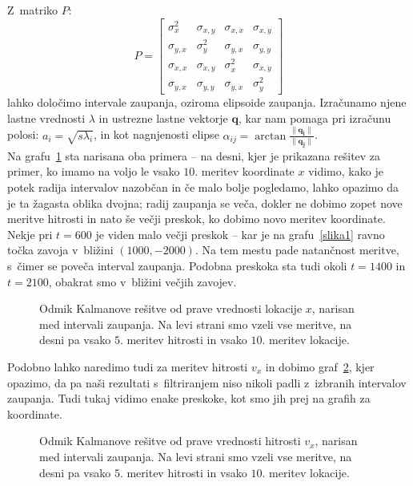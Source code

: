 \documentclass[a4paper,pdftex,10pt]{article}
\renewcommand{\vec}[1]{\boldsymbol{\mathbf{#1}}}
\numberwithin{figure}{section} %
\begin{document}
Z~matriko $P$:
\begin{equation}
    P = 
    \begin{bmatrix}
	\sigma_x^2 &  \sigma_{x,y} & \sigma_{x, \dot{x}} & \sigma_{x, \dot{y}}\\
	\sigma_{y,x} & \sigma_y^2 & \sigma_{y, \dot{x}} & \sigma_{y, \dot{y}}\\
	\sigma_{\dot{x},x} & \sigma_{\dot{x},y} 
			   & \sigma_{\dot{x}}^2 & \sigma_{\dot{x}, \dot{y}}\\
	\sigma_{\dot{y},x} & \sigma_{\dot{y},y} 
			   & \sigma_{\dot{y}, \dot{x}} & \sigma_{\dot{y}}^2
    \end{bmatrix}
\end{equation}
lahko določimo intervale zaupanja, oziroma elipsoide zaupanja. Izračunamo
njene lastne vrednosti $\lambda$ in ustrezne lastne vektorje $\vec{q}$, kar nam pomaga
pri izračunu polosi: $a_i=\sqrt{s \lambda_i}$, in kot nagnjenosti elipse $\alpha_{ij} = 
\arctan \frac{\| \vec{q_i} \|}{\| \vec{q_j} \|}$.\\
Na grafu~\ref{slika3} sta narisana oba primera -- na desni, kjer je prikazana rešitev za 
primer, ko imamo na voljo le vsako $10.$ meritev koordinate $x$ vidimo, kako je potek 
radija intervalov nazobčan in če malo bolje pogledamo, lahko opazimo da je ta žagasta 
oblika dvojna; radij zaupanja se veča, dokler ne dobimo zopet nove meritve hitrosti in 
nato še večji preskok, ko dobimo novo meritev koordinate. Nekje pri $t=600$ je viden malo 
večji preskok -- kar je na grafu~\ref{slika1} ravno točka zavoja v~bližini $(1000,-2000)$. 
Na tem mestu pade natančnost meritve, s~čimer se poveča interval zaupanja. Podobna 
preskoka sta tudi okoli $t=1400$ in $t=2100$, obakrat smo v~bližini večjih zavojev.\\
\begin{figure}[H]
    \centering
    \resizebox{.45\linewidth}{!}{}
    \resizebox{.45\linewidth}{!}{}
    \caption{Odmik Kalmanove rešitve od prave vrednosti lokacije $x$, narisan med intervali 
    zaupanja.  Na levi strani smo vzeli vse meritve, na desni pa vsako $5.$ meritev 
    hitrosti in vsako $10.$ meritev lokacije.}
    \label{slika3}
\end{figure}
Podobno lahko naredimo tudi za meritev hitrosti $v_x$ in dobimo graf~\ref{slika4}, kjer 
opazimo, da pa naši rezultati s~filtriranjem niso nikoli padli z~izbranih intervalov 
zaupanja. Tudi tukaj vidimo enake preskoke, kot smo jih prej na grafih za koordinate.
\begin{figure}[H]
    \centering
    \resizebox{.45\linewidth}{!}{}
    \resizebox{.45\linewidth}{!}{}
    \caption{Odmik Kalmanove rešitve od prave vrednosti hitrosti $v_x$, narisan med 
    intervali zaupanja.  Na levi strani smo vzeli vse meritve, na desni pa vsako $5.$ 
    meritev hitrosti in vsako $10.$ meritev lokacije.}
    \label{slika4}
\end{figure}
\end{document}
